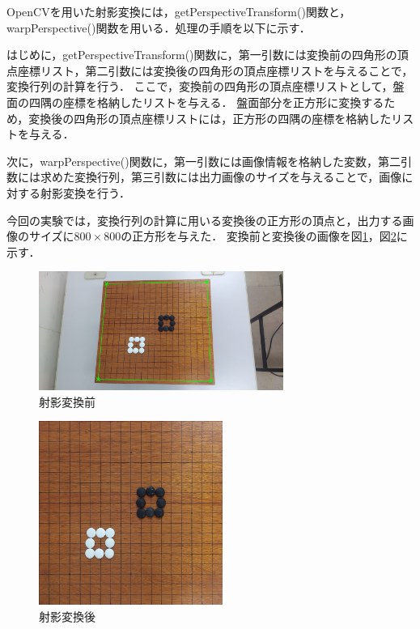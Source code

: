 \documentclass[openright]{nitocs}
\numberwithin{equation}{section}
\begin{document}
            OpenCVを用いた射影変換には，getPerspectiveTransform()関数と，warpPerspective()関数を用いる．処理の手順を以下に示す．

            はじめに，getPerspectiveTransform()関数に，第一引数には変換前の四角形の頂点座標リスト，第二引数には変換後の四角形の頂点座標リストを与えることで，変換行列の計算を行う．
            ここで，変換前の四角形の頂点座標リストとして，盤面の四隅の座標を格納したリストを与える．
            盤面部分を正方形に変換するため，変換後の四角形の頂点座標リストには，正方形の四隅の座標を格納したリストを与える．

            次に，warpPerspective()関数に，第一引数には画像情報を格納した変数，第二引数には求めた変換行列，第三引数には出力画像のサイズを与えることで，画像に対する射影変換を行う．

            今回の実験では，変換行列の計算に用いる変換後の正方形の頂点と，出力する画像のサイズに$800\times800$の正方形を与えた．
            変換前と変換後の画像を図\ref{cornerImg}，図\ref{boardImg}に示す．

            \begin{figure}[tb] %
                \begin{center}
                \includegraphics[clip,width=80mm]{cornerImg.jpg} 
                \caption{射影変換前}
                \label{cornerImg}
                \end{center}
            \end{figure}
            \begin{figure}[tb] %
                \begin{center}
                \includegraphics[clip,width=60mm]{boardImg.jpg} 
                \caption{射影変換後}
                \label{boardImg}
                \end{center}
            \end{figure}
\end{document}
